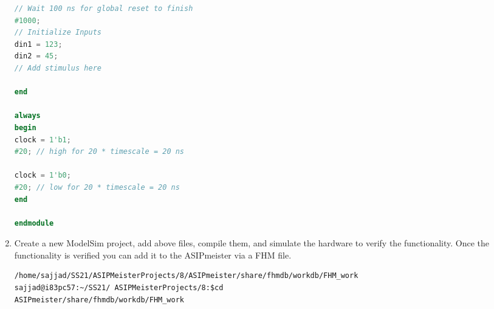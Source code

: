 \begin{enumerate}[resume]
\begin{lstlisting}[language=verilog,caption={"testbench.v"},captionpos=t]
// Wait 100 ns for global reset to finish
#1000;
// Initialize Inputs
din1 = 123;
din2 = 45;       
// Add stimulus here

end

always 
begin
clock = 1'b1; 
#20; // high for 20 * timescale = 20 ns

clock = 1'b0;
#20; // low for 20 * timescale = 20 ns
end

endmodule
\end{lstlisting}	
\item Create a new ModelSim project, add above files, compile them, and simulate the hardware to verify the functionality. Once the functionality is verified you can add it to the ASIPmeister via a FHM file.
\begin{lstlisting}
/home/sajjad/SS21/ASIPMeisterProjects/8/ASIPmeister/share/fhmdb/workdb/FHM_work
sajjad@i83pc57:~/SS21/ ASIPMeisterProjects/8:$cd
ASIPmeister/share/fhmdb/workdb/FHM_work
\end{lstlisting}
\end{enumerate}
